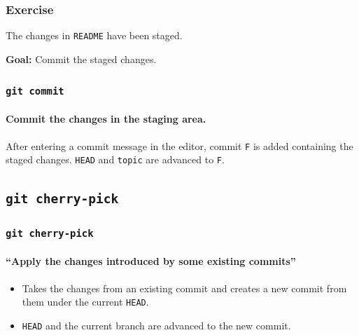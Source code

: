 \documentclass{beamer}
\newcommand\gitcmd[1]{\texttt{git #1}}
\newcommand\grefspec[1]{\texttt{#1}}
\newcommand\gbranch[1]{\texttt{#1}}
\newcommand\gHEAD{\texttt{HEAD}}
\newcommand\goal[1]{\textbf{Goal:} #1}
\begin{document}
\begin{frame}
  \frametitle{Exercise}
  The changes in \texttt{README} have been staged.

  \goal{Commit the staged changes.}

  \begin{figure}
    \centering
  \end{figure}
\end{frame}

\begin{frame}
  \frametitle{\gitcmd{commit}}
  \framesubtitle{Commit the changes in the staging area.}
  \begin{figure}
    \centering
  \end{figure}

  After entering a commit message in the editor, commit \grefspec{F} is added containing the staged changes.
  \gHEAD{} and \gbranch{topic} are advanced to \grefspec{F}.
\end{frame}

\subsection{\gitcmd{cherry-pick}}
\begin{frame}
  \frametitle{\gitcmd{cherry-pick}}
  \framesubtitle{``Apply the changes introduced by some existing commits''}
  \begin{itemize}
    \item Takes the changes from an existing commit and creates a new commit from them under the current \gHEAD{}.
    \item \gHEAD{} and the current branch are advanced to the new commit.
  \end{itemize}
\end{frame}
\end{document}
